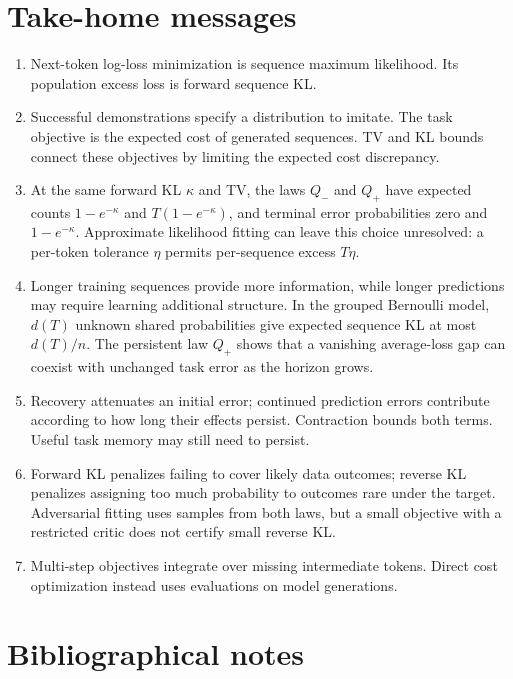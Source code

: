 \documentclass[11pt,twoside]{article}
\theoremstyle{definition}
\theoremstyle{remark}
\begin{document}
\section{Take-home messages}
\label{sec:take-home}

\begin{enumerate}[leftmargin=*,itemsep=0.3em]
\item Next-token log-loss minimization is sequence maximum likelihood.
Its population excess loss is forward sequence KL.
\item Successful demonstrations specify a distribution to imitate.
The task objective is the expected cost of generated sequences.
TV and KL bounds connect these objectives by limiting the expected
cost discrepancy.
\item At the same forward KL \(\kappa\) and TV, the laws $Q_-$ and $Q_+$
have expected counts \(1-e^{-\kappa}\) and \(T(1-e^{-\kappa})\),
and terminal error probabilities zero and \(1-e^{-\kappa}\).
Approximate likelihood fitting can leave this choice unresolved:
a per-token tolerance \(\eta\) permits per-sequence excess \(T\eta\).
\item Longer training sequences provide more information, while longer
predictions may require learning additional structure. In the grouped
Bernoulli model, \(d(T)\) unknown shared probabilities give expected
sequence KL at most \(d(T)/n\). The persistent law $Q_+$
shows that a vanishing average-loss gap can coexist with unchanged
task error as the horizon grows.
\item Recovery attenuates an initial error; continued prediction errors
contribute according to how long their effects persist. Contraction
bounds both terms. Useful task memory may still need to persist.
\item Forward KL penalizes failing to cover likely data outcomes; reverse
KL penalizes assigning too much probability to outcomes rare under the
target. Adversarial fitting uses samples from both laws, but a small
objective with a restricted critic does not certify small reverse KL.
\item Multi-step objectives integrate over missing intermediate tokens.
Direct cost optimization instead uses evaluations on model generations.
\end{enumerate}

\clearpage
\printendnotes

\section*{Bibliographical notes}
\label{sec:bibliographical-notes}
\end{document}
